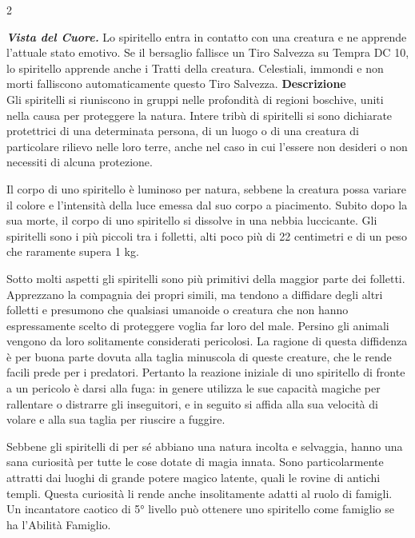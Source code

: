 \begin{multicols}{2}
{\emph{\textbf{Vista del Cuore.}} Lo spiritello entra in contatto con una creatura e ne apprende l'attuale stato emotivo. Se il bersaglio fallisce un Tiro Salvezza su Tempra DC 10, lo spiritello apprende anche i Tratti della creatura. Celestiali, immondi e non morti falliscono automaticamente questo Tiro Salvezza.
\textbf{Descrizione}\\
Gli spiritelli si riuniscono in gruppi nelle profondità di regioni boschive, uniti nella causa per proteggere la natura. Intere tribù di spiritelli si sono dichiarate protettrici di una determinata persona, di un luogo o di una creatura di particolare rilievo nelle loro terre, anche nel caso in cui l'essere non desideri o non necessiti di alcuna protezione.

Il corpo di uno spiritello è luminoso per natura, sebbene la creatura possa variare il colore e l'intensità della luce emessa dal suo corpo a piacimento. Subito dopo la sua morte, il corpo di uno spiritello si dissolve in una nebbia luccicante. Gli spiritelli sono i più piccoli tra i folletti, alti poco più di 22 centimetri e di un peso che raramente supera 1 kg.

Sotto molti aspetti gli spiritelli sono più primitivi della maggior parte dei folletti. Apprezzano la compagnia dei propri simili, ma tendono a diffidare degli altri folletti e presumono che qualsiasi umanoide o creatura che non hanno espressamente scelto di proteggere voglia far loro del male. Persino gli animali vengono da loro solitamente considerati pericolosi. La ragione di questa diffidenza è per buona parte dovuta alla taglia minuscola di queste creature, che le rende facili prede per i predatori. Pertanto la reazione iniziale di uno spiritello di fronte a un pericolo è darsi alla fuga: in genere utilizza le sue capacità magiche per rallentare o distrarre gli inseguitori, e in seguito si affida alla sua velocità di volare e alla sua taglia per riuscire a fuggire.

Sebbene gli spiritelli di per sé abbiano una natura incolta e selvaggia, hanno una sana curiosità per tutte le cose dotate di magia innata. Sono particolarmente attratti dai luoghi di grande potere magico latente, quali le rovine di antichi templi. Questa curiosità li rende anche insolitamente adatti al ruolo di famigli. Un incantatore caotico di 5° livello può ottenere uno spiritello come famiglio se ha l'Abilità Famiglio.

}
\end{multicols}
